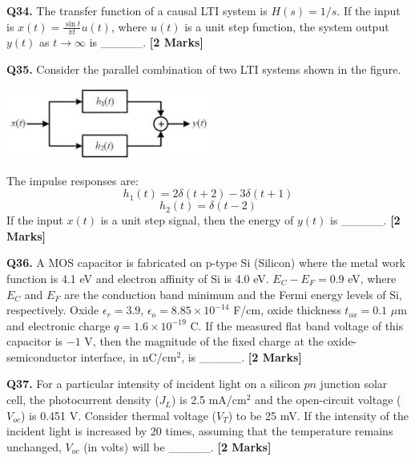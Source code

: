 \documentclass[11pt]{article}
\newcommand{\questionb}[2]{
    \noindent\textbf{Q#2.} #1 \hfill \textbf{[2 Marks]}
}
\begin{document}
\vspace{0.5cm}

\questionb{The transfer function of a causal LTI system is $H(s) = 1/s$. If the input is $x(t) = \frac{\sin t}{\pi t} u(t)$, where $u(t)$ is a unit step function, the system output $y(t)$ as $t \to \infty$ is \_\_\_\_\_.}{34}

\vspace{0.5cm}

\questionb{Consider the parallel combination of two LTI systems shown in the figure.
\begin{center}
\includegraphics[width=0.5\textwidth]{figures/35.png}
\end{center}
The impulse responses are:
\[
h_1(t) = 2\delta(t+2) - 3\delta(t+1)
\]
\[
h_2(t) = \delta(t-2)
\]
If the input $x(t)$ is a unit step signal, then the energy of $y(t)$ is \_\_\_\_\_.}{35}

\vspace{0.5cm}

\questionb{A MOS capacitor is fabricated on p-type Si (Silicon) where the metal work function is 4.1 eV and electron affinity of Si is 4.0 eV. $E_C - E_F = 0.9$ eV, where $E_C$ and $E_F$ are the conduction band minimum and the Fermi energy levels of Si, respectively. Oxide $\epsilon_r = 3.9$, $\epsilon_o = 8.85 \times 10^{-14}$ F/cm, oxide thickness $t_{ox} = 0.1$ $\mu$m and electronic charge $q = 1.6 \times 10^{-19}$ C. If the measured flat band voltage of this capacitor is $-1$ V, then the magnitude of the fixed charge at the oxide-semiconductor interface, in nC/cm$^2$, is \_\_\_\_\_.}{36}

\vspace{0.5cm}

\questionb{For a particular intensity of incident light on a silicon $pn$ junction solar cell, the photocurrent density ($J_L$) is 2.5 mA/cm$^2$ and the open-circuit voltage ($V_{oc}$) is 0.451 V. Consider thermal voltage ($V_T$) to be 25 mV. If the intensity of the incident light is increased by 20 times, assuming that the temperature remains unchanged, $V_{oc}$ (in volts) will be \_\_\_\_\_.}{37}

\vspace{0.5cm}
\end{document}
